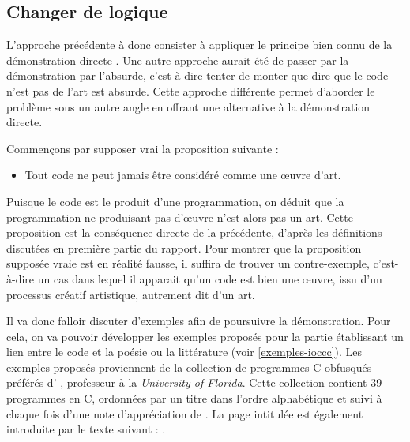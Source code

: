 \documentclass[12pt]{article} %
\begin{document}
\subsection{Changer de logique}
L'approche précédente à donc consister à appliquer le principe bien connu de la démonstration directe \cite{MDidier-Renforcement}. Une autre approche aurait été de passer par la démonstration par l'absurde, c'est-à-dire tenter de monter que dire que le code n'est pas de l'art est absurde. Cette approche différente permet d'aborder le problème sous un autre angle en offrant une alternative à la démonstration directe. 

Commençons par supposer vrai la proposition suivante :
\begin{itemize}
    \item Tout code ne peut jamais être considéré comme une œuvre d'art. 
\end{itemize}
Puisque le code est le produit d'une programmation, on déduit que la programmation ne produisant pas d'œuvre n'est alors pas un art. Cette proposition est la conséquence directe de la précédente, d'après les définitions discutées en première partie du rapport. Pour montrer que la proposition supposée vraie est en réalité fausse, il suffira de trouver un contre-exemple, c'est-à-dire un cas dans lequel il apparait qu'un code est bien une œuvre, issu d'un processus créatif artistique, autrement dit d'un art.

Il va donc falloir discuter d'exemples afin de poursuivre la démonstration. Pour cela, on va pouvoir développer les exemples proposés pour la partie établissant un lien entre le code et la poésie ou la littérature (voir \ref{exemples-ioccc}). Les exemples proposés proviennent de la collection de programmes C obfusqués préférés d'\citeauthor{MEnriqueBermudez-bio} \cite{MEnriqueBermudez-bio}, professeur à la \textit{University of Florida}. Cette collection contient 39 programmes en C, ordonnées par un titre dans l'ordre alphabétique et suivi à chaque fois d'une note d'appréciation de \citeauthor{MEnriqueBermudez-bio}. La page intitulée  est également introduite par le texte suivant :  \cite{MEnriqueBermudez-ObfuscatedCCode}.
\end{document}
